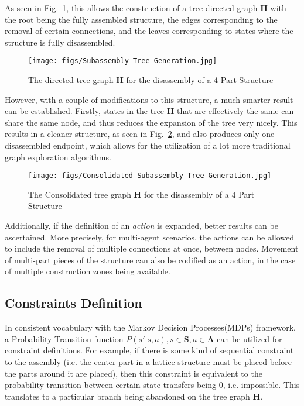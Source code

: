 \documentclass{article}
\begin{document}
As seen in Fig.~\ref{fig: treeGen}, this allows the construction of a tree directed graph $\mathbf{H}$ with the root being the fully assembled structure, the edges corresponding to the removal of certain connections, and the leaves corresponding to states where the structure is fully disassembled.

\begin{figure}[!htb]
\centering
\texttt{[image: figs/Subassembly Tree Generation.jpg]}
  \caption{The directed tree graph  $\mathbf{H}$ for the disassembly of a 4 Part Structure}\label{fig: treeGen}
\end{figure}

However, with a couple of modifications to this structure, a much smarter result can be established. Firstly, states in the tree $\mathbf{H}$ that are effectively the same can share the same node, and thus reduces the expansion of the tree very nicely. This results in a cleaner structure, as seen in Fig.~\ref{fig: treeGen2}, and also produces only one disassembled endpoint, which allows for the utilization of a lot more traditional graph exploration algorithms.

\begin{figure}[!htb]
\centering
\texttt{[image: figs/Consolidated Subassembly Tree Generation.jpg]}
  \caption{The Consolidated tree graph  $\mathbf{H}$ for the disassembly of a 4 Part Structure}\label{fig: treeGen2}
\end{figure}

Additionally, if the definition of an \textit{action} is expanded, better results can be ascertained. More precisely, for multi-agent scenarios, the actions can be allowed to include the removal of multiple connections at once, between nodes. Movement of multi-part pieces of the structure can also be codified as an action, in the case of multiple construction zones being available.

\subsection{Constraints Definition}
In consistent vocabulary with the Markov Decision Processes(MDPs) framework, a Probability Transition function $P(s'|s,a), s\in\mathbf{S}, a\in\mathbf{A}$ can be utilized for constraint definitions. For example, if there is some kind of sequential constraint to the assembly (i.e. the center part in a lattice structure must be placed before the parts around it are placed), then this constraint is equivalent to the probability transition between certain state transfers being 0, i.e. impossible. This translates to a particular branch being abandoned on the tree graph $\mathbf{H}$.
\end{document}
